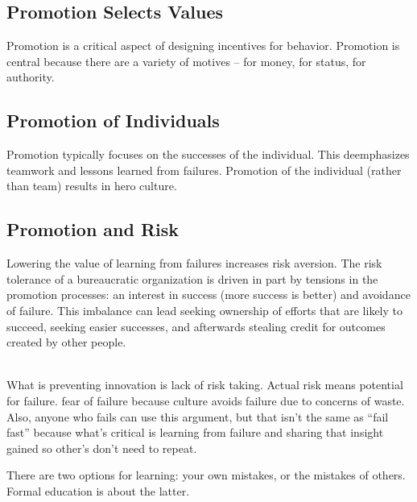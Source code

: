 \subsection*{Promotion Selects Values}
Promotion is a critical aspect of designing incentives for behavior. Promotion is central because there are a variety of motives -- for money, for status, for authority. 


\subsection*{Promotion of Individuals}

Promotion typically focuses on the successes of the individual. This deemphasizes teamwork and lessons learned from failures. 
Promotion of the individual (rather than team) results in hero culture.

\subsection*{Promotion and Risk}

Lowering the value of learning from failures increases risk aversion. The risk tolerance of a bureaucratic organization is driven in part by tensions in the promotion processes: an interest in success (more success is better) and avoidance of failure. This imbalance can lead seeking ownership of efforts that are likely to succeed, seeking easier successes, and afterwards stealing credit for outcomes created by other people. 

\ \\

What is preventing innovation is lack of risk taking. Actual risk means potential for failure. fear of failure because culture avoids failure due to concerns of waste. Also, anyone who fails can use this argument, but that isn't the same as ``fail fast'' because what's critical is learning from failure and sharing that insight gained so other's don't need to repeat. 

There are two options for learning: your own mistakes, or the mistakes of others. Formal education is about the latter.
